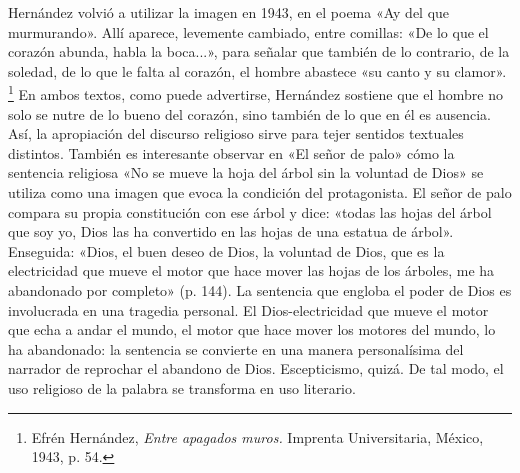\documentclass[14pt,twoside,final]{extbook} %
\let\oldfootnote\footnote
\renewcommand\footnote[1]{%
\oldfootnote{\hspace{1mm}#1}}
\begin{document}
Hernández volvió a utilizar la imagen en 1943, en el poema «Ay del que murmurando». Allí aparece, levemente cambiado, entre comillas: «De lo que el corazón abunda, habla la boca...», para señalar que también de lo contrario, de la soledad, de lo que le falta al corazón, el hombre abastece «su canto y su clamor».\footnote{Efrén Hernández, \emph{Entre apagados muros.} Imprenta Universitaria, México, 1943, p. 54.} En ambos textos, como puede advertirse, Hernández sostiene que el hombre no solo se nutre de lo bueno del corazón, sino también de lo que en él es ausencia. Así, la apropiación del discurso religioso sirve para tejer sentidos textuales distintos. También es interesante observar en «El señor de palo» cómo la sentencia religiosa «No se mueve la hoja del árbol sin la voluntad de Dios» se utiliza como una imagen que evoca la condición del protagonista. El señor de palo compara su propia constitución con ese árbol y dice: «todas las hojas del árbol que soy yo, Dios las ha convertido en las hojas de una estatua de árbol». Enseguida: «Dios, el buen deseo de Dios, la voluntad de Dios, que es la electricidad que mueve el motor que hace mover las hojas de los árboles, me ha abandonado por completo» (p. 144). La sentencia que engloba el poder de Dios es involucrada en una tragedia personal. El Dios-electricidad que mueve el motor que echa a andar el mundo, el motor que hace mover los motores del mundo, lo ha abandonado: la sentencia se convierte en una manera personalísima del narrador de reprochar el abandono de Dios. Escepticismo, quizá. De tal modo, el uso religioso de la palabra se transforma en uso literario.
\end{document}
